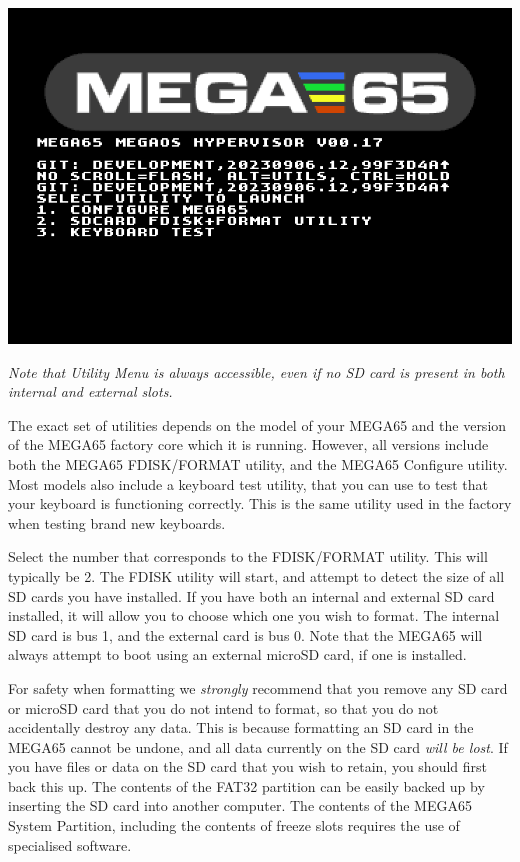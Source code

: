 \includegraphics[width=\linewidth]{images/ss-utilmenu.png}

{\em Note that Utility Menu is always accessible, even if no SD card is present in both internal and external slots.}

The exact set of utilities
depends on the model of your MEGA65 and the version of the MEGA65
factory core which it is running. However, all versions include both
the MEGA65 FDISK/FORMAT utility, and the MEGA65 Configure utility.
Most models also include a keyboard test utility, that you can use
to test that your keyboard is functioning correctly.  This is
the same utility used in the factory when testing brand
new keyboards.

Select the number that corresponds to the FDISK/FORMAT utility.  This
will typically be 2.  The FDISK utility will start, and attempt to
detect the size of all SD cards you have installed.  If you have both
an internal and external SD card installed, it will allow you to
choose which one you wish to format. The internal SD card is bus 1,
and the external card is bus 0.  Note that the MEGA65 will
always attempt to boot using an external microSD card, if one is
installed.

For safety when formatting we {\em strongly} recommend
that you remove any SD card or microSD card that you do not intend to
format, so that you do not accidentally destroy any data.  This is
because formatting an SD card in the MEGA65 cannot be undone, and
all data currently on the SD card {\em will be lost}.  If you
have files or data on the SD card that you wish to retain, you
should first back this up.  The contents of the FAT32
partition can be easily backed up by inserting the SD card into
another computer.  The contents of the MEGA65 System Partition,
including the contents of freeze slots requires the use of specialised
software.

